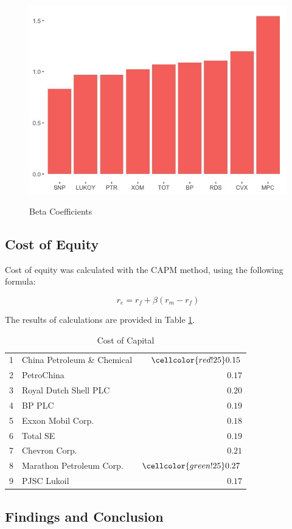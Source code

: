 \documentclass [a4paper, 11pt] {article}
\begin{document}
\begin{figure}[!h]
\caption{Beta Coefficients}
\includegraphics[scale=0.65]{beta_plot_bars}
\label{fig:beta}
\end{figure}

\clearpage
\subsection {Cost of Equity}

Cost of equity was calculated with the CAPM method, using the following formula:

$$ r_e = r_f + \beta (r_m - r_f)$$

The results of calculations are provided in Table \ref{tab:r_e}.

\begin{table}[!h]
\caption{Cost of Capital\label{r}} 
\begin{center}
\begin{tabular}{llr}
\hline\hline
1&China Petroleum \& Chemical&$ \cellcolor{red!25} 0.15$\tabularnewline
2&PetroChina&$0.17$\tabularnewline
3&Royal Dutch Shell PLC&$0.20$\tabularnewline
4&BP PLC&$0.19$\tabularnewline
5&Exxon Mobil Corp.&$0.18$\tabularnewline
6&Total SE&$0.19$\tabularnewline
7&Chevron Corp.&$0.21$\tabularnewline
8&Marathon Petroleum Corp.&$ \cellcolor{green!25}0.27$\tabularnewline
9&PJSC Lukoil&$0.17$\tabularnewline
\hline
\end{tabular}\end{center}
\label{tab:r_e}
\end{table}



\clearpage
\subsection {Findings and Conclusion}

\clearpage
\newpage
\printbibliography [heading=bibintoc]
\end{document}

